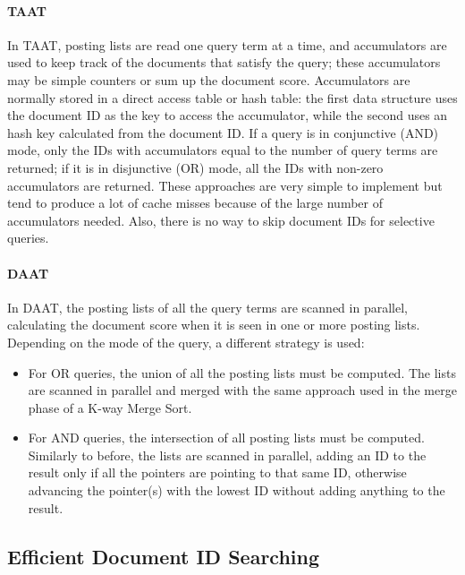 \paragraph{TAAT}
In TAAT, posting lists are read one query term at a time, and accumulators are used to keep track of the documents that satisfy the query; these accumulators may be simple counters or sum up the document score. Accumulators are normally stored in a direct access table or hash table: the first data structure uses the document ID as the key to access the accumulator, while the second uses an hash key calculated from the document ID. If a query is in conjunctive (AND) mode, only the IDs with accumulators equal to the number of query terms are returned; if it is in disjunctive (OR) mode, all the IDs with non-zero accumulators are returned. These approaches are very simple to implement but tend to produce a lot of cache misses because of the large number of accumulators needed. Also, there is no way to skip document IDs for selective queries.

\paragraph{DAAT}
In DAAT, the posting lists of all the query terms are scanned in parallel, calculating the document score when it is seen in one or more posting lists. Depending on the mode of the query, a different strategy is used:
\begin{itemize}
    \item For OR queries, the union of all the posting lists must be computed. The lists are scanned in parallel and merged with the same approach used in the merge phase of a K-way Merge Sort.
    \item For AND queries, the intersection of all posting lists must be computed. Similarly to before, the lists are scanned in parallel, adding an ID to the result only if all the pointers are pointing to that same ID, otherwise advancing the pointer(s) with the lowest ID without adding anything to the result.
\end{itemize}

\subsection{Efficient Document ID Searching}

